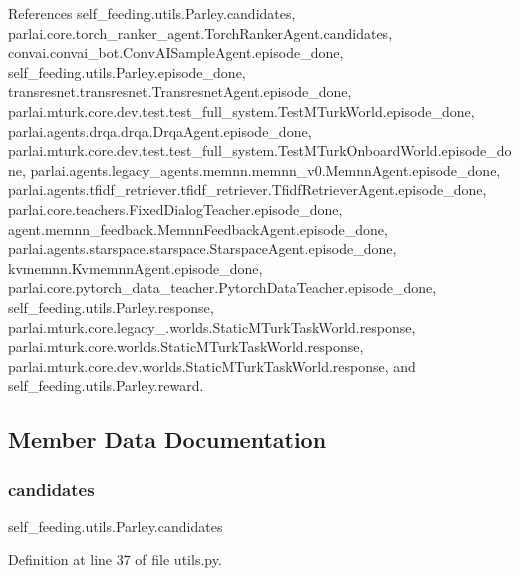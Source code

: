 References self\+\_\+feeding.\+utils.\+Parley.\+candidates, parlai.\+core.\+torch\+\_\+ranker\+\_\+agent.\+Torch\+Ranker\+Agent.\+candidates, convai.\+convai\+\_\+bot.\+Conv\+A\+I\+Sample\+Agent.\+episode\+\_\+done, self\+\_\+feeding.\+utils.\+Parley.\+episode\+\_\+done, transresnet.\+transresnet.\+Transresnet\+Agent.\+episode\+\_\+done, parlai.\+mturk.\+core.\+dev.\+test.\+test\+\_\+full\+\_\+system.\+Test\+M\+Turk\+World.\+episode\+\_\+done, parlai.\+agents.\+drqa.\+drqa.\+Drqa\+Agent.\+episode\+\_\+done, parlai.\+mturk.\+core.\+dev.\+test.\+test\+\_\+full\+\_\+system.\+Test\+M\+Turk\+Onboard\+World.\+episode\+\_\+done, parlai.\+agents.\+legacy\+\_\+agents.\+memnn.\+memnn\+\_\+v0.\+Memnn\+Agent.\+episode\+\_\+done, parlai.\+agents.\+tfidf\+\_\+retriever.\+tfidf\+\_\+retriever.\+Tfidf\+Retriever\+Agent.\+episode\+\_\+done, parlai.\+core.\+teachers.\+Fixed\+Dialog\+Teacher.\+episode\+\_\+done, agent.\+memnn\+\_\+feedback.\+Memnn\+Feedback\+Agent.\+episode\+\_\+done, parlai.\+agents.\+starspace.\+starspace.\+Starspace\+Agent.\+episode\+\_\+done, kvmemnn.\+Kvmemnn\+Agent.\+episode\+\_\+done, parlai.\+core.\+pytorch\+\_\+data\+\_\+teacher.\+Pytorch\+Data\+Teacher.\+episode\+\_\+done, self\+\_\+feeding.\+utils.\+Parley.\+response, parlai.\+mturk.\+core.\+legacy\+\_.\+worlds.\+Static\+M\+Turk\+Task\+World.\+response, parlai.\+mturk.\+core.\+worlds.\+Static\+M\+Turk\+Task\+World.\+response, parlai.\+mturk.\+core.\+dev.\+worlds.\+Static\+M\+Turk\+Task\+World.\+response, and self\+\_\+feeding.\+utils.\+Parley.\+reward.



\subsection{Member Data Documentation}
\mbox{\label{classself__feeding_1_1utils_1_1Parley_a5c197e261eeb326bd8f38afa228aafa8}} 
\subsubsection{\texorpdfstring{candidates}{candidates}}
{\footnotesize\ttfamily self\+\_\+feeding.\+utils.\+Parley.\+candidates}



Definition at line 37 of file utils.\+py.



